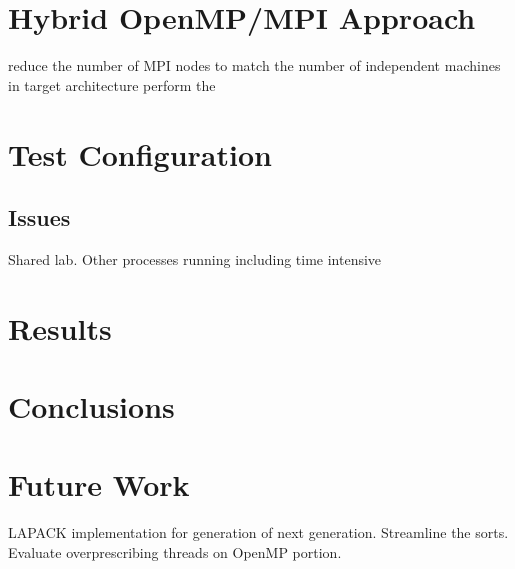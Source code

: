 \documentclass[twocolumn, balance]{article}
\begin{document}
\section{Hybrid OpenMP/MPI Approach}

reduce the number of MPI nodes to match the number of independent machines in target architecture
perform the 

\section{Test Configuration}
\subsection{Issues}
Shared lab.  Other processes running including time intensive

\section{Results}

\section{Conclusions}

\section{Future Work}
LAPACK implementation for generation of next generation.
Streamline the sorts.
Evaluate overprescribing threads on OpenMP portion.
\end{document}
